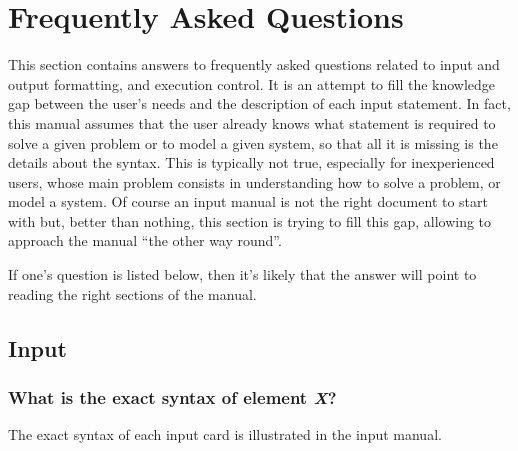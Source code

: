 %
%
%
%
%
% 
%
%

\chapter{Frequently Asked Questions}\label{sec:FAQ}
This section contains answers to frequently asked questions
related to input and output formatting, and execution control.
It is an attempt to fill the knowledge gap between the user's needs
and the description of each input statement.
In fact, this manual assumes that the user already knows what statement
is required to solve a given problem or to model a given system, so that
all it is missing is the details about the syntax.
This is typically not true, especially for inexperienced users, whose
main problem consists in understanding how to solve a problem,
or model a system.
Of course an input manual is not the right document to start with but,
better than nothing, this section is trying to fill this gap,
allowing to approach the manual ``the other way round''.

If one's question is listed below, then it's likely that the answer 
will point to reading the right sections of the manual.

\section{Input}
\subsection{What is the exact syntax of element \emph{X}?}
The exact syntax of each input card is illustrated in the input manual.

